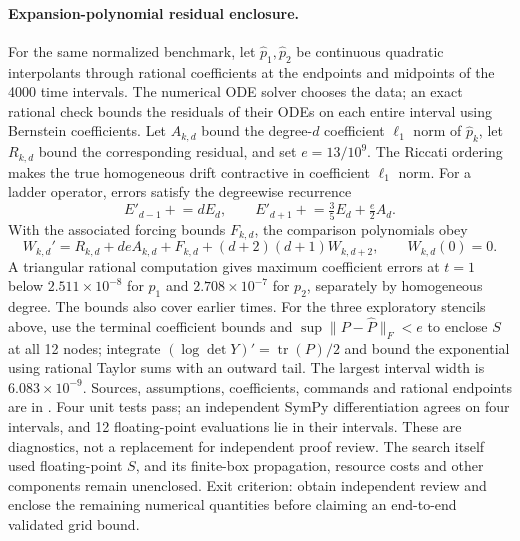 \documentclass[11pt,a4paper]{article}
\begin{document}
\paragraph{Expansion-polynomial residual enclosure.}
For the same normalized benchmark, let $\widehat p_1,\widehat p_2$ be
continuous quadratic interpolants through rational coefficients at the
endpoints and midpoints of the 4000 time intervals. The numerical ODE solver
chooses the data; an exact rational check bounds the residuals of their ODEs
on each entire interval using Bernstein coefficients. Let $A_{k,d}$ bound
the degree-$d$ coefficient $\ell_1$ norm of $\widehat p_k$, let $R_{k,d}$
bound the corresponding residual, and set $e=13/10^9$. The Riccati ordering
makes the true homogeneous drift contractive in coefficient $\ell_1$ norm.
For a ladder operator, errors satisfy the degreewise recurrence
\[
 E'_{d-1}\mathrel{+}=dE_d,\qquad
 E'_{d+1}\mathrel{+}=\tfrac35E_d+\tfrac e2 A_d.
\]
With the associated forcing bounds $F_{k,d}$, the comparison polynomials obey
\[
 W_{k,d}'=R_{k,d}+deA_{k,d}+F_{k,d}
 +(d+2)(d+1)W_{k,d+2},\qquad W_{k,d}(0)=0.
\]
A triangular rational computation gives maximum coefficient errors at $t=1$
below $2.511\times10^{-8}$ for $p_1$ and $2.708\times10^{-7}$ for $p_2$,
separately by homogeneous degree. The bounds also cover earlier times. For
the three exploratory stencils above, use the terminal coefficient bounds and
$\sup\|P-\widehat P\|_F<e$ to enclose $S$ at all 12 nodes; integrate
$(\log\det Y)'=\operatorname{tr}(P)/2$ and bound the exponential using
rational Taylor sums with an outward tail. The largest interval width is
$6.083\times10^{-9}$. Sources, assumptions, coefficients, commands and
rational endpoints are in .
Four unit tests pass; an independent SymPy differentiation agrees on four
intervals, and 12 floating-point evaluations lie in their intervals. These
are diagnostics, not a replacement for independent proof review. The search
itself used floating-point $S$, and its finite-box propagation, resource costs
and other components remain unenclosed. Exit criterion: obtain independent
review and enclose the remaining numerical quantities before claiming an
end-to-end validated grid bound.
\end{document}
